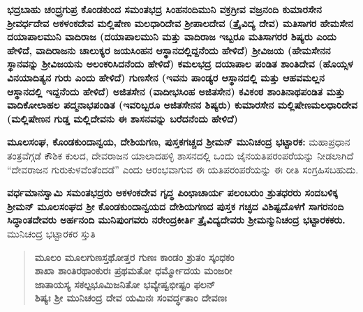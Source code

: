 \textbf{ಭದ್ರಬಾಹು \general{\enginline{-}} ಚಂದ್ರ್ರಗುಪ್ರ \general{\enginline{-}} ಕೊಂಡಕುಂದ \general{\enginline{-}} ಸಮಂತಭದ್ರ \general{\enginline{-}} ಸಿಂಹನಂದಿಮುನಿ \general{\enginline{-}} ವಕ್ರಗ್ರೀವ \general{\enginline{-}} ವಜ್ರನಂದಿ \general{\enginline{-}} ಕುಮಾರಸೇನ \general{\enginline{-}} ಶ‍್ರೀವರ್ಧದೇವ \general{\enginline{-}} ಅಕಳಂಕದೇವ \general{\enginline{-}} ಮಲ್ಲಿಷೇಣ ಮಲಧಾರಿದೇವ \general{\enginline{-}} ಶ‍್ರೀಪಾಲದೇವ (ತ್ರೈವಿದ್ಯ ದೇವ) \general{\enginline{-}} ಮತಿಸಾಗರ \general{\enginline{-}} ಹೇಮಸೇನ \general{\enginline{-}} ದಯಾಪಾಲಮುನಿ \general{\enginline{-}} ವಾದಿರಾಜ (ದಯಾಪಾಲಮುನಿ ಮತ್ತು ವಾದಿರಾಜ ಇಬ್ಬರೂ ಮತಿಸಾಗರರ ಶಿಷ್ಯರು ಎಂದು ಹೇಳಿದೆ, ವಾದಿರಾಜನು ಚಾಲುಕ್ಯರ ಜಯಸಿಂಹನ ಆಸ್ಥಾನದಲ್ಲಿದ್ದನೆಂದು ಹೇಳಿದೆ) \general{\enginline{-}} ಶ‍್ರೀವಿಜಯ (ಹೇಮಸೇನನ ಸ್ಥಾನವನ್ನು ಶ‍್ರೀವಿಜಯನು ಅಲಂಕರಿಸಿದನೆಂದು ಹೇಳಿದೆ) \general{\enginline{-}} ಕಮಲಭದ್ರ \general{\enginline{-}} ದಯಾಪಾಲ ಪಂಡಿತ \general{\enginline{-}} ಶಾಂತಿದೇವ (ಹೊಯ್ಸಳ ವಿನಯಾದಿತ್ಯನ ಗುರು ಎಂದು ಹೇಳಿದೆ) \general{\enginline{-}} ಗುಣಸೇನ (ಇವನು ಪಾಂಡ್ಯರ ಆಸ್ಥಾನದಲ್ಲಿ ಮತ್ತು ಆಹವಮಲ್ಲನ ಆಸ್ಥಾನದಲ್ಲಿ ಇದ್ದನೆಂದು ಹೇಳಿದೆ) \general{\enginline{-}} ಅಜಿತಸೇನ (ವಾದೀಭಸಿಂಹ ಅಜಿತಸೇನ) \general{\enginline{-}} ಕವಿಕಂಠ ಶಾಂತಿನಾಥಪಂಡಿತ ಮತ್ತು ವಾದಿಕೋಲಾಹಲ ಪದ್ಮನಾಭಪಂಡಿತ (ಇವರಿಬ್ಬರೂ ಅಜಿತಸೇನನ ಶಿಷ್ಯರು) \general{\enginline{-}} ಕುಮಾರಸೇನ \general{\enginline{-}}\general{\break } ಮಲ್ಲಿಷೇಣಮಲಧಾರಿದೇವ \general{\enginline{-}} (ಮಲ್ಲಿಷೇಣನ ಗುಡ್ಡ ಮಲ್ಲಿದೇವನು ಈ ಶಾಸನವನ್ನು ಬರೆದನೆಂದು ಹೇಳಿದೆ)}

\textbf{ಮೂಲಸಂಘ, ಕೊಂಡಕುಂದಾನ್ವಯ, ದೇಶಿಯಗಣ, ಪುಸ್ತಕಗಚ್ಚದ ಶ‍್ರೀಮನ್​ ಮುನಿಚಂದ್ರ ಭಟ್ಟಾರಕ:} ಮಹಾಪ್ರಧಾನ ತಂತ್ರವೆಗ್ಗಡೆ ಕೌಶಿಕ ಕುಲದ, ದೇವರಾಜನ ಯಾಲಾದಹಳ್ಳಿ ಶಾಸನದಲ್ಲಿ ಒಂದು ಜೈನಯತಿಪರಂಪರೆಯನ್ನು ನೀಡಲಾಗಿದೆ “ದೇವರಾಜನ ಗುರುಕುಳವೆಂತೆಂದಡೆ” ಎಂದು ಆರಂಭವಾಗುವ ಈ ಯತಿಪರಂಪರೆಯನ್ನು ಈ ರೀತಿ ಸಂಗ್ರಹಿಸಬಹುದು.

\textbf{ವರ್ಧಮಾನಸ್ವಾಮಿ \general{\enginline{-}} ಸಮಂತಭದ್ರರು \general{\enginline{-}} ಅಕಳಂಕದೇವ \general{\enginline{-}} ಗೃದ್ಧ ಪಿಂಛಾಚಾರ್ಯ \general{\enginline{-}} ಪಲಂಬರುಂ ಶ್ರುತಧರರು ಸಂದಬಳಿಕ್ಕ ಶ‍್ರೀಮನ್​ ಮೂಲಸಂಘದ ಶ‍್ರೀ ಕೊಂಡಕುಂದಾನ್ವಯದ ದೇಶಿಯಗಣದ ಪುಸ್ತಕ ಗಚ್ಛದ ವಿಶಿಷ್ಟದೊಳಗೆ \general{\enginline{-}} ಸಾಗರನಂದಿ ಸಿದ್ಧಾಂತದೇವರು \general{\enginline{-}} ಅರ್ಹನಂದಿ ಮುನಿಪುಂಗವರು \general{\enginline{-}} ನರೇಂದ್ರಕೀರ್ತಿ ತ್ರೈವಿದ್ಯದೇವರು \general{\enginline{-}} ಶ‍್ರೀಮನ್ಮುನಿಚಂದ್ರ ಭಟ್ಟಾರಕಕರು.} ಮುನಿಚಂದ್ರ ಭಟ್ಟಾರಕರ ಸ್ತುತಿ

\begin{verse}
\textbf{ಮೂಲಂ ಮೂಲಗುಣಸ್ತಥೋತ್ತರ ಗುಣಃ ಕಾಂಡಂ ಶ್ರುತಂ ಸ್ಕಂಧಕಂ} \\\textbf{ಶಾಖಾ ಶಾಂತಿರಥಾಂಕುರಃ ಪ್ರಥಮತೋ ಧರ್ಮ್ಮೋದಯ ಮಂಜರೀ} \\\textbf{ಜಾತಾಯಸ್ಯ ಸಕಲ್ಪಭೂಮಿಜನಿತೋ ಭವ್ಯೇಷ್ವಭೀಷ್ಟಂ ಫಲನ್​} \\\textbf{ಶಿಷ್ಯಃ ಶ‍್ರೀ ಮುನಿಚಂದ್ರ ದೇವ ಯಮಿನಃ ಸಂವರ್ದ್ಧತಾಂ ದೇವಣಃ}
\end{verse}

